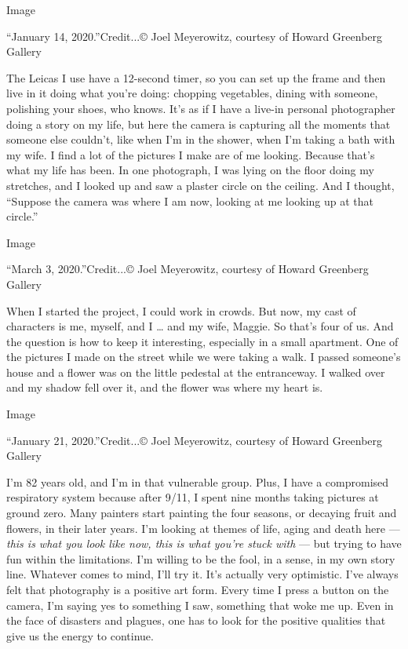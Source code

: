 Image

``January 14, 2020.''Credit...© Joel Meyerowitz, courtesy of Howard
Greenberg Gallery

The Leicas I use have a 12-second timer, so you can set up the frame and
then live in it doing what you're doing: chopping vegetables, dining
with someone, polishing your shoes, who knows. It's as if I have a
live-in personal photographer doing a story on my life, but here the
camera is capturing all the moments that someone else couldn't, like
when I'm in the shower, when I'm taking a bath with my wife. I find a
lot of the pictures I make are of me looking. Because that's what my
life has been. In one photograph, I was lying on the floor doing my
stretches, and I looked up and saw a plaster circle on the ceiling. And
I thought, ``Suppose the camera was where I am now, looking at me
looking up at that circle.''

Image

``March 3, 2020.''Credit...© Joel Meyerowitz, courtesy of Howard
Greenberg Gallery

When I started the project, I could work in crowds. But now, my cast of
characters is me, myself, and I \ldots{} and my wife, Maggie. So that's
four of us. And the question is how to keep it interesting, especially
in a small apartment. One of the pictures I made on the street while we
were taking a walk. I passed someone's house and a flower was on the
little pedestal at the entranceway. I walked over and my shadow fell
over it, and the flower was where my heart is.

Image

``January 21, 2020.''Credit...© Joel Meyerowitz, courtesy of Howard
Greenberg Gallery

I'm 82 years old, and I'm in that vulnerable group. Plus, I have a
compromised respiratory system because after 9/11, I spent nine months
taking pictures at ground zero. Many painters start painting the four
seasons, or decaying fruit and flowers, in their later years. I'm
looking at themes of life, aging and death here --- \emph{this is what
you look like now, this is what you're stuck with} --- but trying to
have fun within the limitations. I'm willing to be the fool, in a sense,
in my own story line. Whatever comes to mind, I'll try it. It's actually
very optimistic. I've always felt that photography is a positive art
form. Every time I press a button on the camera, I'm saying yes to
something I saw, something that woke me up. Even in the face of
disasters and plagues, one has to look for the positive qualities that
give us the energy to continue.

